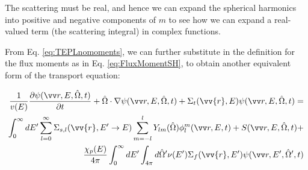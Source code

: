 The scattering must be real, and hence we can expand the spherical harmonics into positive and negative components of \(m\) to see how we can expand a real-valued term (the scattering integral) in complex functions. 

From Eq. \eqref{eq:TEPLnomoments}, we can further substitute in the definition for the flux moments as in Eq. \ref{eq:FluxMomentSH},  to obtain another equivalent form of the transport equation:

\begin{equation}
\label{eq:TEPL}
\begin{aligned}
\frac{1}{v(E)} \frac{\partial\psi\spa }{\partial t} +
 \hO  \cdot\nabla\psi\spa  + 
 \Sigma_t(\vv{r},E)\psi\spa  = \\
 \int_{0}^{\infty}dE' \sum_{l=0}^{\infty} \Sigma_{s,l}(\vv{r}, E'\rightarrow E) \sum_{m=-l}^{l} Y_{lm}(\hO  )\phi_l^m\spas + S\spa +\\
\frac{\chi_p(E)}{4\pi} \int_{0}^{\infty} dE'\int_{4\pi}^{} d\hO  '\nu(E')\Sigma_f(\vv{r}, E')\psi\spap\\
\end{aligned}
\end{equation}

